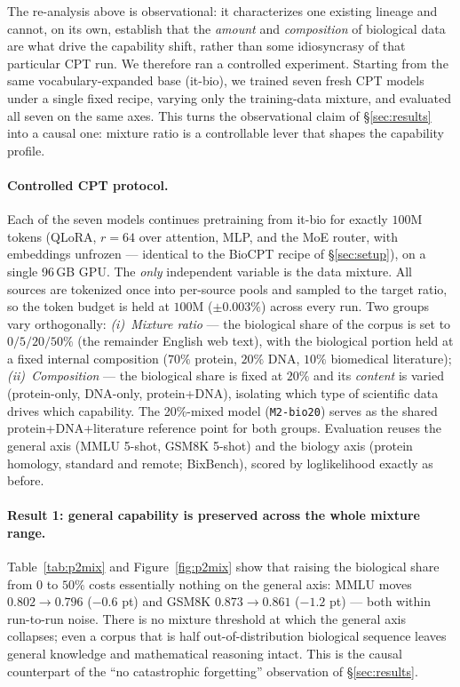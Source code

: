 
The re-analysis above is observational: it characterizes one existing lineage and cannot,
on its own, establish that the \emph{amount} and \emph{composition} of biological data are what
drive the capability shift, rather than some idiosyncrasy of that particular CPT run. We
therefore ran a controlled experiment. Starting from the same vocabulary-expanded base (it-bio),
we trained seven fresh CPT models under a single fixed recipe, varying only the training-data
mixture, and evaluated all seven on the same axes. This turns the observational claim of
\S\ref{sec:results} into a causal one: mixture ratio is a controllable lever that shapes the
capability profile.

\paragraph{Controlled CPT protocol.} Each of the seven models continues pretraining from it-bio
for exactly $100$M tokens (QLoRA, $r{=}64$ over attention, MLP, and the MoE router, with
embeddings unfrozen --- identical to the BioCPT recipe of \S\ref{sec:setup}), on a single
96\,GB GPU. The \emph{only} independent variable is the data mixture. All sources are tokenized
once into per-source pools and sampled to the target ratio, so the token budget is held at
$100$M ($\pm0.003\%$) across every run. Two groups vary orthogonally:
\emph{(i)~Mixture ratio} --- the biological share of the corpus is set to $0/5/20/50\%$ (the
remainder English web text), with the biological portion held at a fixed internal composition
($70\%$ protein, $20\%$ DNA, $10\%$ biomedical literature); \emph{(ii)~Composition} --- the
biological share is fixed at $20\%$ and its \emph{content} is varied (protein-only, DNA-only,
protein+DNA), isolating which type of scientific data drives which capability. The 20\%-mixed
model (\texttt{M2-bio20}) serves as the shared protein+DNA+literature reference point for both
groups. Evaluation reuses the general axis (MMLU 5-shot, GSM8K 5-shot) and the biology axis
(protein homology, standard and remote; BixBench), scored by loglikelihood exactly as before.

\paragraph{Result 1: general capability is preserved across the whole mixture range.}
Table~\ref{tab:p2mix} and Figure~\ref{fig:p2mix} show that raising the biological share from
$0$ to $50\%$ costs essentially nothing on the general axis: MMLU moves $0.802\!\to\!0.796$
($-0.6$ pt) and GSM8K $0.873\!\to\!0.861$ ($-1.2$ pt) --- both within run-to-run noise. There is
no mixture threshold at which the general axis collapses; even a corpus that is half
out-of-distribution biological sequence leaves general knowledge and mathematical reasoning
intact. This is the causal counterpart of the ``no catastrophic forgetting'' observation of
\S\ref{sec:results}.

